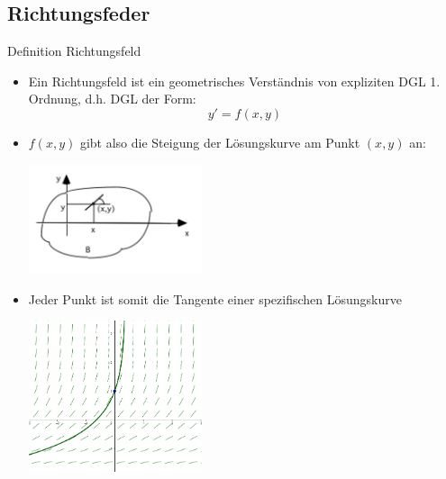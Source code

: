 \subsection{Richtungsfeder}
\begin{definition}{Definition Richtungsfeld}\\
  \begin{itemize}
    \item Ein Richtungsfeld ist ein geometrisches Verständnis von expliziten DGL 1. Ordnung, d.h. DGL der Form:
      \[y'=f(x,y)\]
    \item \(f(x,y)\) gibt also die Steigung der Lösungskurve am Punkt \((x,y)\) an:
  \begin{center}
  \includegraphics[width=0.4\textwidth]{images/Richtungsfeld.png}
  \end{center}
    \item Jeder Punkt ist somit die Tangente einer spezifischen Lösungskurve
  \begin{center}
  \includegraphics[width=0.4\textwidth]{images/RichtungsfeldKurve.png}
  \end{center}
  \end{itemize}
\end{definition}
